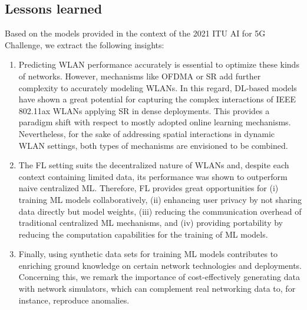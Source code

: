 \documentclass[10pt,a4paper,twocolumn]{article}
\begin{document}

\subsection{Lessons learned}

Based on the models provided in the context of the 2021 ITU AI for 5G Challenge, we extract the following insights:
\begin{enumerate}
	\item Predicting WLAN performance accurately is essential to optimize these kinds of networks. However, mechanisms like OFDMA or SR add further complexity to accurately modeling WLANs. In this regard, DL-based models have shown a great potential for capturing the complex interactions of IEEE 802.11ax WLANs applying SR in dense deployments. This provides a paradigm shift with respect to mostly adopted online learning mechanisms. Nevertheless, for the sake of addressing spatial interactions in dynamic WLAN settings, both types of mechanisms are envisioned to be combined.
	\item The FL setting suits the decentralized nature of WLANs and, despite each context containing limited data, its performance was shown to outperform naive centralized ML. Therefore, FL provides great opportunities for (i) training ML models collaboratively, (ii) enhancing user privacy by not sharing data directly but model weights, (iii) reducing the communication overhead of traditional centralized ML mechanisms, and (iv) providing portability by reducing the computation capabilities for the training of ML models. 
	\item Finally, using synthetic data sets for training ML models contributes to enriching ground knowledge on certain network technologies and deployments. Concerning this, we remark the importance of cost-effectively generating data with network simulators, which can complement real networking data to, for instance, reproduce anomalies.
\end{enumerate}

\end{document}
